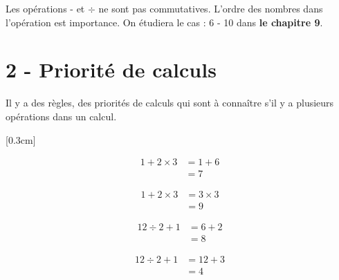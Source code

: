 \documentclass[11pt]{article}
\begin{document}
\reversemarginpar\marginnote{$\Box \Box$}
Les opérations - et $\div$ ne sont pas commutatives. L'ordre des nombres dans l'opération est importance. 
On étudiera le cas : 6 - 10 dans \textbf{le chapitre 9}.

\section*{2 - Priorité de calculs}

Il y a des règles, des priorités de calculs qui sont à connaître s'il y a plusieurs opérations dans un calcul. 

\begin{center}
\reversemarginpar\marginnote{$\Box \Box$}
\reversemarginpar\marginnote{$\Box \Box$}[0.3cm]
     \\
\end{center} \vspace{-1cm}


\begin{minipage}[t]{0.5\textwidth}

\begin{align*}
1 + 2 \times 3 &= 1 + 6 \\
               &= 7
\end{align*}

\end{minipage}\begin{minipage}[t]{0.5\textwidth}

\begin{align*}
1 + 2 \times 3 &= 3 \times 3 \\
               &= 9
\end{align*}

\end{minipage}

\begin{minipage}[t]{0.5\textwidth}

\begin{align*}
12 \div 2 + 1 &= 6 + 2 \\
              &= 8
\end{align*}

\end{minipage}\begin{minipage}[t]{0.5\textwidth}

\begin{align*}
12 \div 2 + 1 &= 12 + 3 \\
              &= 4
\end{align*}

\end{minipage}
\end{document}
